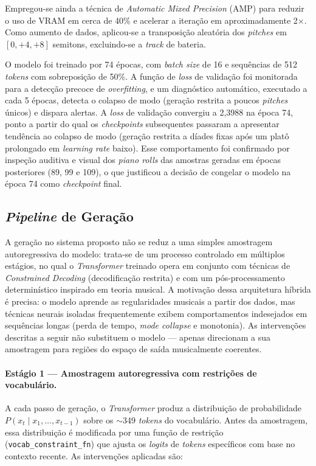 \documentclass[12pt]{article}
\begin{document}
Empregou-se ainda a técnica de \emph{Automatic Mixed Precision} (AMP) para reduzir
o uso de VRAM em cerca de 40\% e acelerar a iteração em aproximadamente
2$\times$. Como aumento de dados, aplicou-se a transposição aleatória dos
\emph{pitches} em $[0, +4, +8]$ semitons, excluindo-se a \emph{track} de bateria.

O modelo foi treinado por 74 épocas, com \emph{batch size} de 16 e sequências de
512 \emph{tokens} com sobreposição de 50\%. A função de \emph{loss} de validação
foi monitorada para a detecção precoce de \emph{overfitting}, e um diagnóstico
automático, executado a cada 5 épocas, detecta o colapso de modo (geração restrita
a poucos \emph{pitches} únicos) e dispara alertas. A \emph{loss} de validação
convergiu a 2,3988 na época 74, ponto a partir do qual os \emph{checkpoints}
subsequentes passaram a apresentar tendência ao colapso de modo (geração restrita
a díades fixas após um platô prolongado em \emph{learning rate} baixo). Esse
comportamento foi confirmado por inspeção auditiva e visual dos \emph{piano rolls}
das amostras geradas em épocas posteriores (89, 99 e 109), o que justificou a
decisão de congelar o modelo na época 74 como \emph{checkpoint} final.

\subsection{\emph{Pipeline} de Geração}

A geração no sistema proposto não se reduz a uma simples amostragem autoregressiva
do modelo: trata-se de um processo controlado em múltiplos estágios, no qual o
\emph{Transformer} treinado opera em conjunto com técnicas de \emph{Constrained
Decoding} (decodificação restrita) e com um pós-processamento determinístico
inspirado em teoria musical. A motivação dessa arquitetura híbrida é precisa: o
modelo aprende as regularidades musicais a partir dos dados, mas técnicas neurais
isoladas frequentemente exibem comportamentos indesejados em sequências longas
(perda de tempo, \emph{mode collapse} e monotonia). As intervenções descritas a
seguir não substituem o modelo --- apenas direcionam a sua amostragem para regiões
do espaço de saída musicalmente coerentes.

\paragraph{Estágio 1 --- Amostragem autoregressiva com restrições de
vocabulário.} A cada passo de geração, o \emph{Transformer} produz a distribuição
de probabilidade $P(x_t \mid x_1, \ldots, x_{t-1})$ sobre os $\sim$349
\emph{tokens} do vocabulário. Antes da amostragem, essa distribuição é modificada
por uma função de restrição (\texttt{vocab\_constraint\_fn}) que ajusta os
\emph{logits} de \emph{tokens} específicos com base no contexto recente. As
intervenções aplicadas são:
\end{document}
